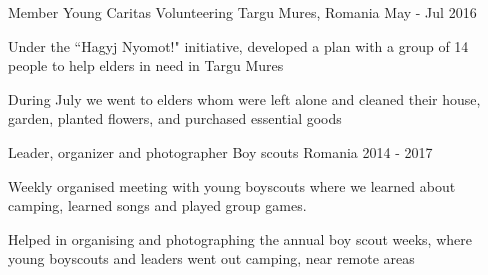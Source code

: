 
\begin{cventries}

    \cventry
        {Member}
        {Young Caritas Volunteering}
        {Targu Mures, Romania}
        {May - Jul 2016}
        {
            \begin{cvitems}
                \item {Under the ``Hagyj Nyomot!" initiative, developed a plan with a group of 14 people to help elders in need in Targu Mures}
                \item {During July we went to elders whom were left alone and cleaned their house, garden, planted flowers, and purchased essential goods}
            \end{cvitems}
        }

    \cventry
        {Leader, organizer and photographer}
        {Boy scouts}
        {Romania}
        {2014 - 2017}
        {
            \begin{cvitems}
                \item {Weekly organised meeting with young boyscouts where we learned about camping, learned songs and played group games.}
                \item {Helped in organising and photographing the annual boy scout weeks, where  young boyscouts and  leaders went out camping, near remote areas}
            \end{cvitems}
        }

\end{cventries}


